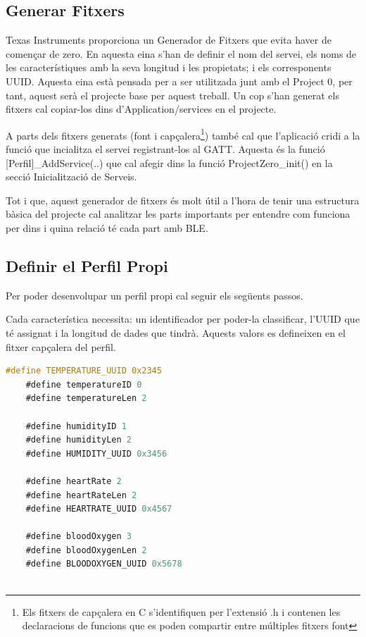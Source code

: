 \subsection{Generar Fitxers}
Texas Instruments proporciona un Generador de Fitxers \cite{Service_Generator} que evita haver de començar de zero.
En aquesta eina s'han de definir el nom del servei, els noms de les característiques amb la seva longitud i les propietats; i els corresponents UUID.
Aquesta eina està pensada per a ser utilitzada junt amb el Project 0, per tant, aquest serà el projecte base per aquest treball.
Un cop s'han generat els fitxers cal copiar-los dins d'Application/services en el projecte.

A parts dels fitxers generats (font i capçalera\footnote{Els fitxers de capçalera en C s'identifiquen per l'extensió .h i contenen les declaracions de funcions que es poden compartir entre múltiples fitxers font}) també cal que l'aplicació cridi a la funció que incialitza el servei registrant-los al GATT.
Aquesta és la funció [Perfil]\_AddService(..) que cal afegir dins la funció ProjectZero\_init() en la secció Inicialització de Serveis.

Tot i que, aquest generador de fitxers és molt útil a l'hora de tenir una estructura bàsica del projecte cal analitzar les parts importants per entendre com funciona per dins i quina relació té cada part amb BLE.

\subsection{Definir el Perfil Propi}
Per poder desenvolupar un perfil propi cal seguir els següents passos.

Cada característica necessita: un identificador per poder-la classificar, l'UUID que té assignat i la longitud de dades que tindrà.
Aquests valors es defineixen en el fitxer capçalera del perfil.

\begin{lstlisting}[language=C]
	#define TEMPERATURE_UUID 0x2345
	#define temperatureID 0
	#define temperatureLen 2
	
	#define humidityID 1
	#define humidityLen 2
	#define HUMIDITY_UUID 0x3456
	
	#define heartRate 2
	#define heartRateLen 2
	#define HEARTRATE_UUID 0x4567
	
	#define bloodOxygen 3
	#define bloodOxygenLen 2
	#define BLOODOXYGEN_UUID 0x5678
	
\end{lstlisting}

